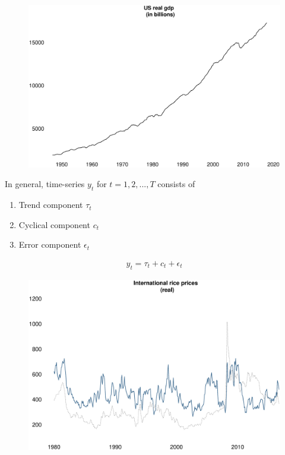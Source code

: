 \documentclass{beamer}
\begin{document}
\begin{frame}
  \begin{figure}
    \includegraphics[scale=.25]{us_gdp.eps}
  \end{figure}
\end{frame}

\begin{frame}
  In general, time-series $y_t$ for $t=1,2,...,T$ consists of  
 \begin{enumerate}
   \item Trend component $\tau_t$
   \item Cyclical component $c_t$
   \item Error component $\epsilon_t$
 \end{enumerate}
 \begin{align}
   y_t=\tau_t + c_t + \epsilon_t
 \end{align}
\end{frame}

\begin{frame}
  \begin{figure}
    \includegraphics[scale=.3]{rice2.eps}
  \end{figure}
\end{frame}
\end{document}
